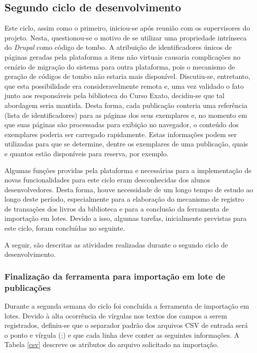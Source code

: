 \documentclass[a4paper]{article}
\begin{document}
\subsection{Segundo ciclo de desenvolvimento}
Este ciclo, assim como o primeiro, iniciou-se após reunião com os supervisores do projeto. Nesta, questionou-se o motivo de se utilizar uma propriedade intrínseca do \textit{Drupal} como código de tombo. A atribuição de identificadores únicos de páginas geradas pela plataforma a itens não virtuais causaria complicações no cenário de migração do sistema para outra plataforma, pois o mecanismo de geração de códigos de tombo não estaria mais disponível. Discutiu-se, entretanto, que esta possibilidade era consideravelmente remota e, uma vez validado o fato junto aos responsáveis pela biblioteca do Curso Exato, decidiu-se que tal abordagem seria mantida. Desta forma, cada publicação conteria uma referência (lista de identificadores) para as páginas dos seus exemplares e, no momento em que suas páginas são processadas para exibição no navegador, o conteúdo dos exemplares poderia ser carregado rapidamente. Estas informações podem ser utilizadas para que se determine, dentre os exemplares de uma publicação, quais e quantos estão disponíveis para reserva, por exemplo.

Algumas funções providas pela plataforma e necessárias para a implementação de novas funcionalidades para este ciclo eram desconhecidas dos alunos desenvolvedores. Desta forma, houve necessidade de um longo tempo de estudo ao longo deste período, especialmente para a elaboração do mecanismo de registro de transações dos livros da biblioteca e para a conclusão da ferramenta de importação em lotes. Devido a isso, algumas tarefas, inicialmente previstas para este ciclo, foram concluídas no seguinte.

A seguir, são descritas as atividades realizadas durante o segundo ciclo de desenvolvimento.


\subsubsection{Finalização da ferramenta para importação em lote de publicações}

Durante a segunda semana do ciclo foi concluída a ferramenta de importação em lotes. Devido à alta ocorrência de vírgulas nos textos dos campos a serem registrados, definiu-se que o separador padrão dos arquivos CSV de entrada será o ponto e vírgula (;) e que cada linha deve conter as seguintes informações. A Tabela \ref{csv} descreve os atributos do arquivo solicitado na importação.
\end{document}
